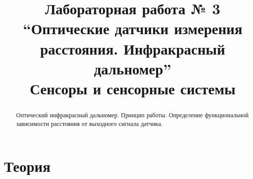 \documentclass[12pt]{article}
\title{Лабораторная работа № 3 \\
``Оптические датчики измерения расстояния. Инфракрасный дальномер'' \\
\large Сенсоры и сенсорные системы}
\begin{document}
\maketitle
\tableofcontents
\begin{abstract}
    Оптический инфракрасный дальномер. Принцип работы. Определение функциональной зависимости расстояния от выходного сигнала датчика.
\end{abstract}

\section{Теория}
\end{document}
